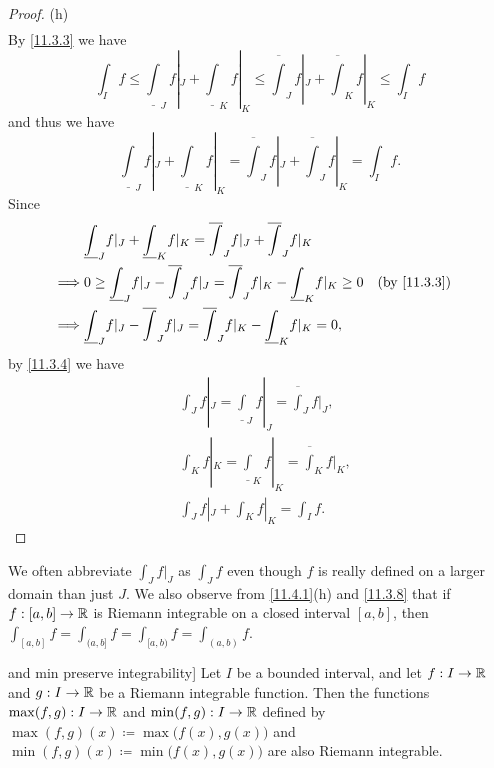 \begin{proof}{(h)}
\begin{align*}
  \end{align*}
  By \cref{11.3.3} we have
  \[
    \int_I f \leq \underline{\int}_J f|_J + \underline{\int}_K f|_K \leq \overline{\int}_J f|_J + \overline{\int}_K f|_K \leq \int_I f
  \]
  and thus we have
  \[
    \underline{\int}_J f|_J + \underline{\int}_K f|_K = \overline{\int}_J f|_J + \overline{\int}_J f|_K = \int_I f.
  \]
  Since
  \begin{align*}
             & \underline{\int}_J f|_J + \underline{\int}_K f|_K = \overline{\int}_J f|_J + \overline{\int}_J f|_K                                \\
    \implies & 0 \geq \underline{\int}_J f|_J - \overline{\int}_J f|_J = \overline{\int}_J f|_K - \underline{\int}_K f|_K \geq 0 &  & \by{11.3.3} \\
    \implies & \underline{\int}_J f|_J - \overline{\int}_J f|_J = \overline{\int}_J f|_K - \underline{\int}_K f|_K = 0,
  \end{align*}
  by \cref{11.3.4} we have
  \begin{align*}
     & \int_J f|_J = \underline{\int}_J f|_J = \overline{\int}_J f|_J, \\
     & \int_K f|_K = \underline{\int}_K f|_K = \overline{\int}_K f|_K, \\
     & \int_J f|_J + \int_K f|_K = \int_I f.
  \end{align*}
\end{proof}

\begin{rmk}\label{11.4.2}
  We often abbreviate \(\int_J f|_J\) as \(\int_J f\) even though \(f\) is really defined on a larger domain than just \(J\).
  We also observe from \cref{11.4.1}(h) and \cref{11.3.8} that if \(f : [a, b] \to \mathbb{R}\) is Riemann integrable on a closed interval \([a, b]\), then \(\int_{[a, b]} f = \int_{(a, b]} f = \int_{[a, b)} f = \int_{(a, b)} f\).
\end{rmk}

\begin{thm} and min preserve integrability]\label{11.4.3}
  Let \(I\) be a bounded interval, and let \(f : I \to \mathbb{R}\) and \(g : I \to \mathbb{R}\) be a Riemann integrable function.
  Then the functions \(\max(f, g) : I \to \mathbb{R}\) and \(\min(f, g) : I \to \mathbb{R}\) defined by \(\max(f, g)(x) \coloneqq \max\big(f(x), g(x)\big)\) and \(\min(f, g)(x) \coloneqq \min\big(f(x), g(x)\big)\) are also Riemann integrable.
\end{thm}


